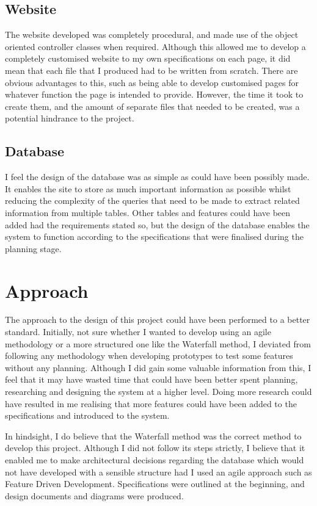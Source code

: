 \subsection{Website}
The website developed was completely procedural, and made use of the object oriented controller classes when required. Although this allowed me to develop a completely customised website to my own specifications on each page, it did mean that each file that I produced had to be written from scratch. There are obvious advantages to this, such as being able to develop customised pages for whatever function the page is intended to provide. However, the time it took to create them, and the amount of separate files that needed to be created, was a potential hindrance to the project.

\subsection{Database}
I feel the design of the database was as simple as could have been possibly made. It enables the site to store as much important information as possible whilst reducing the complexity of the queries that need to be made to extract related information from multiple tables. Other tables and features could have been added had the requirements stated so, but the design of the database enables the system to function according to the specifications that were finalised during the planning stage.

\section{Approach}
The approach to the design of this project could have been performed to a better standard. Initially, not sure whether I wanted to develop using an agile methodology or a more structured one like the Waterfall method, I deviated from following any methodology when developing prototypes to test some features without any planning. Although I did gain some valuable information from this, I feel that it may have wasted time that could have been better spent planning, researching and designing the system at a higher level. Doing more research could have resulted in me realising that more features could have been added to the specifications and introduced to the system.

In hindsight, I do believe that the Waterfall method was the correct method to develop this project. Although I did not follow its steps strictly, I believe that it enabled me to make architectural decisions regarding the database which would not have developed with a sensible structure had I used an agile approach such as Feature Driven Development. Specifications were outlined at the beginning, and design documents and diagrams were produced. 
